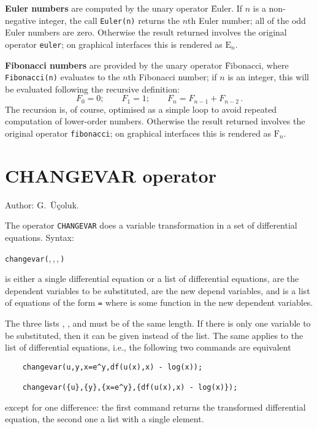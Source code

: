 \hypertarget{operator:EULER}{}
\textbf{Euler numbers} are computed by the unary operator \f{Euler}.  If $n$
is a non-negative integer, the call \texttt{Euler(n)} returns the $n$th
Euler number; all of the odd Euler numbers are zero.
Otherwise the result returned involves the original operator \texttt{euler};
on graphical interfaces this is rendered
as $\mathrm{E}_n$.

\hypertarget{operator:FIBONACCI}{}
\textbf{Fibonacci numbers} are provided by the unary operator \f{Fibonacci},
where \texttt{Fibonacci(n)} evaluates to the $n$th Fibonacci
number; if $n$ is an integer, this will be evaluated following
the recursive definition:
\[F_0 = 0; \qquad F_1 = 1;\qquad F_n = F_{n-1} + F_{n-2}\,.\]
The recursion is, of course, optimised as a simple loop to avoid repeated
computation of lower-order numbers.
Otherwise the result returned involves the original operator
\texttt{fibonacci}; on graphical interfaces this is rendered
as $\mathrm{F}_n$.

\section{CHANGEVAR operator}
\hypertarget{operator:CHANGEVAR}{}

\noindent
Author: G.~\"{U}\c{c}oluk.

The operator \texttt{CHANGEVAR} does a variable transformation in a set of
differential equations.
Syntax:
\begin{syntaxtable}
  \texttt{changevar(},\,,\,,\,\texttt{)}
\end{syntaxtable}
 is either a single differential equation or a list of
differential equations,  are the dependent variables to
be substituted,  are the new depend variables, and
 is a list of equations of the form 
\texttt{=}  where  is some function
in the new dependent variables.

The three lists , , and  must
be of the same length. If there is only one variable to be
substituted, then it can be given instead of the list. The same applies to the list
of differential equations, i.e., the following two
commands are equivalent
\begin{verbatim}
    changevar(u,y,x=e^y,df(u(x),x) - log(x));

    changevar({u},{y},{x=e^y},{df(u(x),x) - log(x)});
\end{verbatim}
except for one difference: the first command returns the transformed differential
equation, the second one a list with a single element.

